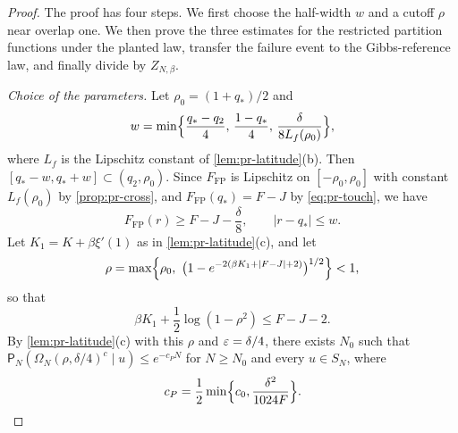 \begin{proof}
The proof has four steps. We first choose the half-width $w$ and a cutoff $\rho$ near overlap one. We then prove the three estimates for the restricted partition functions under the planted law, transfer the failure event to the Gibbs-reference law, and finally divide by $Z_{N,\beta}$.

\emph{Choice of the parameters.} Let $\rho_0=(1+q_*)/2$ and
\[
w=\min\Bigl\{\frac{q_*-q_2}{4},\,\frac{1-q_*}{4},\,\frac{\delta}{8L_f(\rho_0)}\Bigr\},
\]
where $L_f$ is the Lipschitz constant of \cref{lem:pr-latitude}(b). Then $[q_*-w,q_*+w]\subset(q_2,\rho_0)$. Since $F_{\mathrm{FP}}$ is Lipschitz on $[-\rho_0,\rho_0]$ with constant $L_f(\rho_0)$ by \cref{prop:pr-cross}, and $F_{\mathrm{FP}}(q_*)=F-J$ by \eqref{eq:pr-touch}, we have
\begin{equation}\label{eq:pr-core-f}
F_{\mathrm{FP}}(r)\ge F-J-\frac\delta8,\qquad|r-q_*|\le w .
\end{equation}
Let $K_1=K+\beta\xi'(1)$ as in \cref{lem:pr-latitude}(c), and let
\[
\rho=\max\Bigl\{\rho_0,\ \bigl(1-e^{-2(\beta K_1+|F-J|+2)}\bigr)^{1/2}\Bigr\}<1,
\]
so that
\begin{equation}\label{eq:pr-rho}
\beta K_1+\frac12\log(1-\rho^2)\le F-J-2 .
\end{equation}
By \cref{lem:pr-latitude}(c) with this $\rho$ and $\varepsilon=\delta/4$, there exists $N_0$ such that $\mathsf P_N(\Omega_N(\rho,\delta/4)^c\mid u)\le e^{-c_PN}$ for $N\ge N_0$ and every $u\in S_N$, where
\[
c_P=\frac12\min\Bigl\{c_0,\frac{\delta^2}{1024F}\Bigr\}.
\]


\end{proof}
